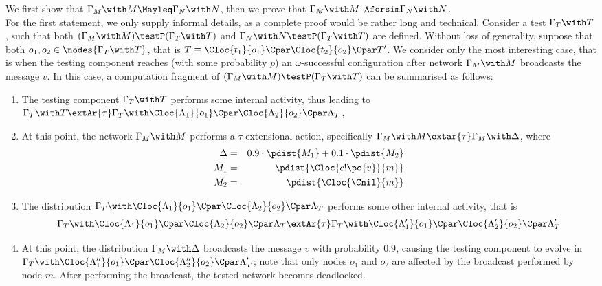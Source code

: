 \documentclass{LMCS}
\begin{document}
\begin{exa}
  We first show that $\Gamma_M \with M \Mayleq \Gamma_N \with N$, then we prove that 
  $\Gamma_M \with M \not\forsim \Gamma_N \with N$.\\ 
  For the first statement, we only supply informal details, as a complete proof would be 
  rather long and technical. 
  Consider a test $\Gamma_T \with T$, such that both 
  $(\Gamma_M \with M) \testP (\Gamma_T \with T)$ and $\Gamma_N \with N \testP 
  (\Gamma_T \with T)$ are defined. Without loss of generality, suppose that both $o_1, o_2 \in 
  \nodes{\Gamma_T \with T}$, that is $T \equiv \Cloc{t_1}{o_1} \Cpar \Cloc{t_2}{o_2} \Cpar T'$. 
  We consider only the most interesting case, that is when the testing component 
  reaches (with some probability $p$) an $\omega$-successful configuration after network 
  $\Gamma_M \with M$ broadcasts the message $v$. In this case, 
  a computation fragment of $(\Gamma_M \with M) \testP (\Gamma_T \with T)$ can 
  be summarised as follows:
  \begin{enumerate}
  	\item The testing component $\Gamma_T \with T$ performs some internal activity, thus leading to 
  	$\Gamma_T \with T \extAr{\tau} \Gamma_T \with \Cloc{\Lambda_1}{o_1} \Cpar \Cloc{\Lambda_2}{o_2} \Cpar \Lambda_T$,
  	\item At this point, the network $\Gamma_M \with M$ 
  	performs a $\tau$-extensional action, specifically $\Gamma_M \with M \extar{\tau} \Gamma_M \with 
  	\Delta$, where 
  	\begin{eqnarray*}
  	\Delta &=& 0.9 \cdot \pdist{M_1} + 0.1 \cdot \pdist{M_2}\\
  	M_1 &=& \pdist{\Cloc{c!\pc{v}}{m}}\\
  	M_2 &=& \pdist{\Cloc{\Cnil}{m}}
  	\end{eqnarray*}
  	
  \item The distribution $\Gamma_T \with \Cloc{\Lambda_1}{o_1} \Cpar \Cloc{\Lambda_2}{o_2} \Cpar \Lambda_T$ 
  performs some other internal activity, that is  
  \[
  \Gamma_T \with \Cloc{\Lambda_1}{o_1} \Cpar \Cloc{\Lambda_2}{o_2} \Cpar \Lambda_T \extAr{\tau} 
  \Gamma_T \with \Cloc{\Lambda'_1}{o_1} \Cpar \Cloc{\Lambda'_2}{o_2} \Cpar \Lambda'_T 
  \]
  \item At this point, the distribution 
 $\Gamma_M \with \Delta$ broadcasts the message $v$ with probability $0.9$, causing 
  	the testing component to evolve in $\Gamma_T \with \Cloc{\Lambda''_1}{o_1} \Cpar \Cloc{\Lambda''_2}{o_2} 
  	\Cpar \Lambda'_T$; note that only nodes $o_1$ and $o_2$ are affected by the broadcast performed by node $m$. 
  	After performing the broadcast, the tested network becomes deadlocked.
  \end{enumerate}
  	

\end{exa}
\end{document}
